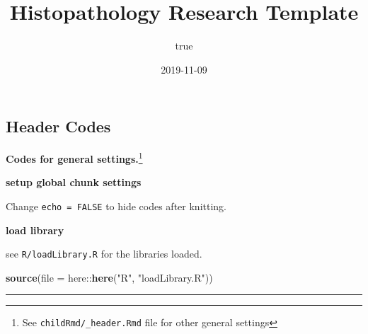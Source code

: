 \documentclass[]{article}
\title{Histopathology Research Template}
\author{true}
\date{2019-11-09}
\newenvironment{Shaded}{\begin{snugshade}}{\end{snugshade}}
\newcommand{\DataTypeTok}[1]{\textcolor[rgb]{0.00,0.34,0.68}{#1}}
\newcommand{\DecValTok}[1]{\textcolor[rgb]{0.69,0.50,0.00}{#1}}
\newcommand{\KeywordTok}[1]{\textcolor[rgb]{0.12,0.11,0.11}{\textbf{#1}}}
\newcommand{\NormalTok}[1]{\textcolor[rgb]{0.12,0.11,0.11}{#1}}
\newcommand{\OperatorTok}[1]{\textcolor[rgb]{0.12,0.11,0.11}{#1}}
\newcommand{\OtherTok}[1]{\textcolor[rgb]{0.00,0.43,0.16}{#1}}
\newcommand{\StringTok}[1]{\textcolor[rgb]{0.75,0.01,0.01}{#1}}
\let\rmarkdownfootnote\footnote%
\def\footnote{\protect\rmarkdownfootnote}
\begin{document}
\maketitle

{
\setcounter{tocdepth}{5}
\tableofcontents
}
\hypertarget{header-codes}{%
\subsection{Header Codes}\label{header-codes}}

\textbf{Codes for general settings.}\footnote{See
  \texttt{childRmd/\_header.Rmd} file for other general settings}

\textbf{setup global chunk settings}

Change \texttt{echo\ =\ FALSE} to hide codes after knitting.

\begin{Shaded}
\end{Shaded}

\textbf{load library}

see \texttt{R/loadLibrary.R} for the libraries loaded.

\begin{Shaded}
\begin{Highlighting}[]
\KeywordTok{source}\NormalTok{(}\DataTypeTok{file =}\NormalTok{ here}\OperatorTok{::}\KeywordTok{here}\NormalTok{(}\StringTok{"R"}\NormalTok{, }\StringTok{"loadLibrary.R"}\NormalTok{))}
\end{Highlighting}
\end{Shaded}

\begin{center}\rule{0.5\linewidth}{\linethickness}\end{center}
\end{document}
